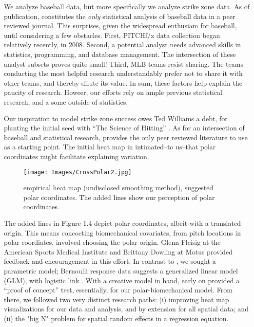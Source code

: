 
We analyze baseball data, but more specifically we analyze strike zone data. As of publication, \cite{Cross2015} constitutes the {\it only} statistical analysis of baseball data in a peer reviewed journal. This surprises, given the widespread enthusiam for baseball, until considering a few obstacles. First, PITCHf/x\textsuperscript{\textregistered} data collection began relatively recently, in 2008. Second, a potential analyst needs advanced skills in statistics, programming, and database management. The intersection of these analyst subsets proves quite small!  Third, MLB teams resist sharing. The teams conducting the most helpful research understandably prefer not to share it with other teams, and thereby dilute its value. In sum, these factors help explain the paucity of research. Howeer, our efforts rely on ample previous statistical research, and a some outside of statistics.

Our inspiration to model strike zone success owes Ted Williams a debt, for planting the initial seed with ``The Science of Hitting'' \citep{Williams1971}. As for an intersection of baseball and statistical research, \cite{Cross2015} provides the only peer reviewed literature to use as a starting point. The initial heat map in \cite{Cross2015} intimated--to us--that polar coordinates might facilitate explaining variation. 
        \begin{figure}[H]
      	\centering
      	\texttt{[image: Images/CrossPolar2.jpg]} 
      	\caption{\cite{Cross2015} empirical heat map (undisclosed smoothing method), suggested polar coordinates. The added lines show our perception of polar coordinates.}
      	\end{figure}
The added lines in Figure 1.4 depict polar coordinates, albeit with a translated origin. This means concocting biomechanical covariates, from pitch locations in polar coordiates, involved choosing the polar origin. Glenn Fleisig at the American Sports Medical Institute \citep{Fleisig2002} and Brittany Dowling at Motus \citep{Dowling2016} provided feedback and encouragement in this effort. In contrast to \citep{Cross2015}, we sought a parametric model; Bernoulli response data suggests a generalized linear model (GLM), with logistic link \citep{Myers2012}. With a creative model in hand, early on \cite{Hosmer2013} provided a ``proof of concept'' test, essentially, for our polar-biomechanical model. From there, we followed two very distinct research paths: (i) improving heat map visualizations for our data and analysis, and by extension for all spatial data; and (ii) the "big N" problem for spatial random effects in a regression equation.

